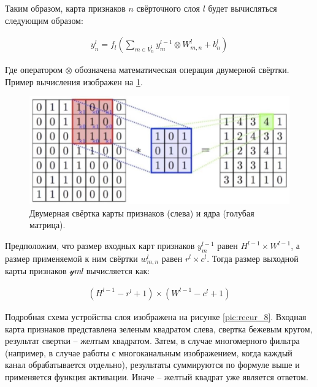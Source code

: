 Таким образом, карта признаков $n$ свёрточного слоя $l$ будет вычисляться следующим образом:

\begin{equation}
  \begin{gathered}
    y_n^l = f_l (\sum_{m \in {V_n^l}} y_m^{l-1} \otimes W_{m,n}^l + b_n^l)
  \end{gathered}
  \label{eq:speach_formula_7}
\end{equation}

Где оператором $\otimes$ обозначена математическая операция двумерной свёртки. Пример вычисления изображен на \ref{pic:recur_7}.

\begin{figure}[h]
\includegraphics[width=0.75\columnwidth]{./img/recur_7.jpg}
\centering
\caption{Двумерная свёртка карты признаков (слева) и ядра (голубая матрица). \cite{7_recur}}
\label{pic:recur_7}
\end{figure}

Предположим, что размер входных карт признаков $y_m^{l-1}$ равен $H^{l-1} \times W^{l-1}$, 
а размер применяемой к ним свёртки $w_{m,n}^l$ равен $r^l \times c^l$. Тогда размер выходной карты признаков 𝓎𝑚𝑙 вычисляется как:

\begin{equation}
  \begin{gathered}
    (H^{l-1} - r^l + 1) \times (W^{l-1} - c^l + 1)
  \end{gathered}
  \label{eq:speach_formula_8}
\end{equation}

Подробная схема устройства слоя изображена на рисунке \ref{pic:recur_8}. 
Входная карта признаков представлена зеленым квадратом слева, свертка бежевым кругом, 
результат свертки – желтым квадратом. Затем, в случае многомерного фильтра 
(например, в случае работы с многоканальным изображением, когда каждый канал обрабатывается отдельно), 
результаты суммируются по формуле выше и применяется функция активации.
Иначе – желтый квадрат уже является ответом.

